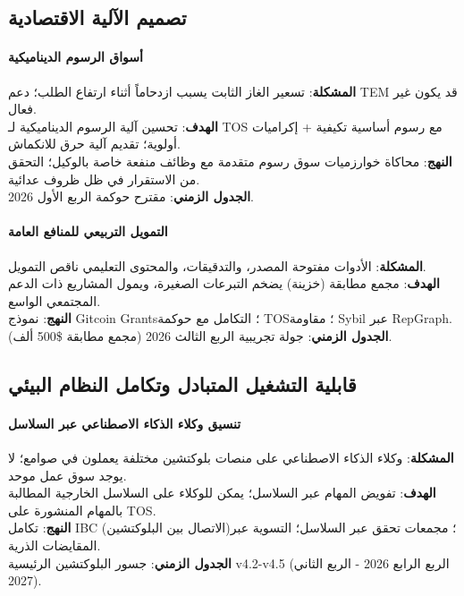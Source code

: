 \documentclass[11pt]{article}
\begin{document}
\subsection{تصميم الآلية الاقتصادية}

\paragraph{أسواق الرسوم الديناميكية}
\textbf{المشكلة}: تسعير الغاز الثابت يسبب ازدحاماً أثناء ارتفاع الطلب؛ دعم TEM قد يكون غير فعال.\\
\textbf{الهدف}: تحسين آلية الرسوم الديناميكية لـ TOS مع رسوم أساسية تكيفية + إكراميات أولوية؛ تقديم آلية حرق للانكماش.\\
\textbf{النهج}: محاكاة خوارزميات سوق رسوم متقدمة مع وظائف منفعة خاصة بالوكيل؛ التحقق من الاستقرار في ظل ظروف عدائية.\\
\textbf{الجدول الزمني}: مقترح حوكمة الربع الأول 2026.

\paragraph{التمويل التربيعي للمنافع العامة}
\textbf{المشكلة}: الأدوات مفتوحة المصدر، والتدقيقات، والمحتوى التعليمي ناقص التمويل.\\
\textbf{الهدف}: مجمع مطابقة (خزينة) يضخم التبرعات الصغيرة، ويمول المشاريع ذات الدعم المجتمعي الواسع.\\
\textbf{النهج}: نموذج Gitcoin Grants؛ التكامل مع حوكمة TOS؛ مقاومة Sybil عبر RepGraph.\\
\textbf{الجدول الزمني}: جولة تجريبية الربع الثالث 2026 (مجمع مطابقة \$500 ألف).

\subsection{قابلية التشغيل المتبادل وتكامل النظام البيئي}

\paragraph{تنسيق وكلاء الذكاء الاصطناعي عبر السلاسل}
\textbf{المشكلة}: وكلاء الذكاء الاصطناعي على منصات بلوكتشين مختلفة يعملون في صوامع؛ لا يوجد سوق عمل موحد.\\
\textbf{الهدف}: تفويض المهام عبر السلاسل؛ يمكن للوكلاء على السلاسل الخارجية المطالبة بالمهام المنشورة على TOS.\\
\textbf{النهج}: تكامل IBC (الاتصال بين البلوكتشين)؛ مجمعات تحقق عبر السلاسل؛ التسوية عبر المقايضات الذرية.\\
\textbf{الجدول الزمني}: جسور البلوكتشين الرئيسية v4.2-v4.5 (الربع الرابع 2026 - الربع الثاني 2027).
\end{document}
